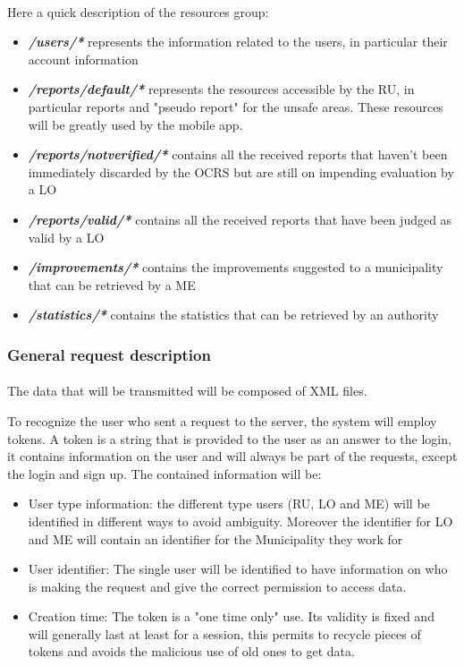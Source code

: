 					\paragraph{}
						Here a quick description of the resources group:
						\begin{itemize}
							\item \textit{\textbf{/users/*}} represents the information related to the users, in particular their account information
							\item \textit{\textbf{/reports/default/*}} represents the resources accessible by the RU, in particular reports and "pseudo report" for the unsafe areas. These resources will be greatly used by the mobile app.
							\item \textit{\textbf{/reports/notverified/*}} contains all the received reports that haven't been immediately discarded by the OCRS but are still on impending evaluation by a LO
							\item \textit{\textbf{/reports/valid/*}} contains all the received reports that have been judged as valid by a LO
							\item \textit{\textbf{/improvements/*}} contains the improvements suggested to a municipality that can be retrieved by a ME
							\item \textit{\textbf{/statistics/*}} contains the statistics that can be retrieved by an authority
						\end{itemize}
				\subsubsection{General request description}
					\paragraph{}
						The data that will be transmitted will be composed of XML files.
						
						To recognize the user who sent a request to the server, the system will employ tokens. A token is a string that is provided to the user as an answer to the login, it contains information on the user and will always be part of the requests, except the login and sign up.
						The contained information will be:
						\begin{itemize}
							\item User type information: the different type users (RU, LO and ME) will be identified in different ways to avoid ambiguity. Moreover the identifier for LO and ME will contain an identifier for the Municipality they work for
							\item User identifier: The single user will be identified to have information on who is making the request and give the correct permission to access data.
							\item Creation time: The token is a "one time only" use. Its validity is fixed and will generally last at least for a session, this permits to recycle pieces of tokens and avoids the malicious use of old ones to get data.
						\end{itemize}
